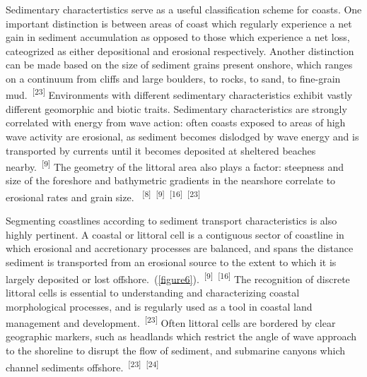 \documentclass{article}
\begin{document}

\par{Sedimentary charactertistics serve as a useful classification scheme for coasts. One important distinction is between areas of coast which regularly experience a net gain in sediment accumulation as opposed to those which experience a net loss, cateogrized as either depositional and erosional respectively. Another distinction can be made based on the size of sediment grains present onshore, which ranges on a continuum from cliffs and large boulders, to rocks, to sand, to fine-grain mud.~\textsuperscript{[23]} Environments with different sedimentary characteristics exhibit vastly different geomorphic and biotic traits. Sedimentary characteristics are strongly correlated with energy from wave action: often coasts exposed to areas of high wave activity are erosional, as sediment becomes dislodged by wave energy and is transported by currents until it becomes deposited at sheltered beaches nearby.~\textsuperscript{[9]} The geometry of the littoral area also plays a factor: steepness and size of the foreshore and bathymetric gradients in the nearshore correlate to erosional rates and grain size. ~\textsuperscript{[8]}~\textsuperscript{[9]}~\textsuperscript{[16]}~\textsuperscript{[23]}}


\par{Segmenting coastlines according to sediment transport characteristics is also highly pertinent. A coastal or littoral cell is a contiguous sector of coastline in which erosional and accretionary processes are balanced, and spans the distance sediment is transported from an erosional source to the extent to which it is largely deposited or lost offshore.~(\cref{figure6}).~\textsuperscript{[9]}~\textsuperscript{[16]} The recognition of discrete littoral cells is essential to understanding and characterizing coastal morphological processes, and is regularly used as a tool in coastal land management and development.~\textsuperscript{[23]} Often littoral cells are bordered by clear geographic markers, such as headlands which restrict the angle of wave approach to the shoreline to disrupt the flow of sediment, and submarine canyons which channel sediments offshore.~\textsuperscript{[23]}~\textsuperscript{[24]} \par}

\end{document}
